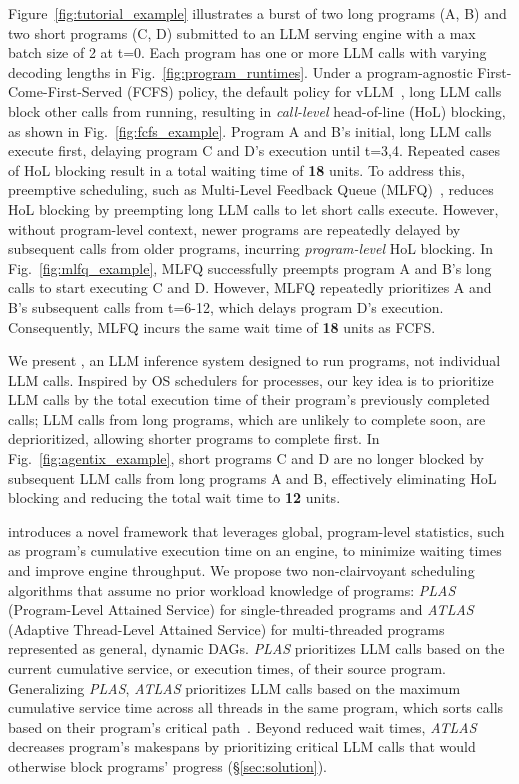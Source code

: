 Figure~\ref{fig:tutorial_example} illustrates a burst of two long programs (A, B) and two short programs (C, D) submitted to an LLM serving engine with a max batch size of 2 at t=0. Each program has one or more LLM calls with varying decoding lengths in Fig.~\ref{fig:program_runtimes}. 
Under a program-agnostic First-Come-First-Served (FCFS) policy, %
the default policy %
for vLLM~\cite{vllm}, long LLM calls block other calls from running, resulting in %
\textit{call-level} head-of-line (HoL) blocking, as shown in Fig.~\ref{fig:fcfs_example}. Program A and B's initial, long LLM calls execute first, delaying program C and D's execution until t=3,4. Repeated cases of HoL blocking result in a total waiting time of \textbf{18} units. To address this, preemptive scheduling, such as Multi-Level Feedback Queue (MLFQ)~\cite{fastserve}, reduces HoL blocking by preempting long LLM calls to let short calls execute. However, without program-level context, newer programs are repeatedly delayed by subsequent calls from older programs, incurring \textit{program-level} HoL blocking. In Fig.~\ref{fig:mlfq_example}, MLFQ successfully preempts program A and B's long calls to start executing C and D. However, MLFQ repeatedly prioritizes A and B's subsequent calls from t=6-12, which delays program D's execution. Consequently, MLFQ incurs the same wait time of \textbf{18} units as FCFS.

We present \text{\name}, an LLM inference system designed to run programs, not individual LLM calls. Inspired by OS schedulers for processes, our key idea is to prioritize LLM calls by the total execution time of their program's previously completed calls; LLM calls from long programs, which are unlikely to complete soon, are deprioritized, allowing shorter programs to complete first. In Fig.~\ref{fig:agentix_example}, short programs C and D are no longer blocked by subsequent LLM calls from long programs A and B, effectively eliminating HoL blocking and reducing the total wait time to \textbf{12} units. 

\text{\name} introduces a novel framework that leverages global, program-level statistics, such as program's cumulative execution time on an engine, to minimize waiting times and improve engine throughput. We propose two non-clairvoyant scheduling algorithms that assume no prior workload knowledge of programs: \textit{PLAS} (Program-Level Attained Service) for single-threaded programs and \textit{ATLAS} (Adaptive Thread-Level Attained Service) for multi-threaded programs represented as general, dynamic DAGs. \textit{PLAS} prioritizes LLM calls based on the current cumulative service, or execution times, of their source program.
Generalizing \textit{PLAS}, \textit{ATLAS} prioritizes LLM calls based on the maximum cumulative service time across all threads in the same program, which sorts calls based on their program's critical path~\cite{cpm}. Beyond reduced wait times, \textit{ATLAS} decreases program's makespans by prioritizing critical LLM calls that would otherwise block programs' progress (\S\ref{sec:solution}).

